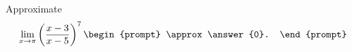 \documentclass{ximera}
\author{Gregory Hartman \and Matthew Carr}
\begin{document}
\begin{exercise}




Approximate 
\[
\lim_{x\to\pi}\p{\frac{x-3}{x-5}}^7
\begin{prompt}
\approx \answer{0}.
\end{prompt}
\]

\end{exercise}
\end{document}
